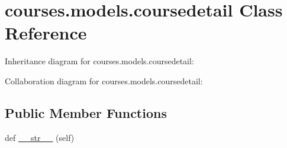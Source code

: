 \hypertarget{classcourses_1_1models_1_1coursedetail}{}\section{courses.\+models.\+coursedetail Class Reference}
\label{classcourses_1_1models_1_1coursedetail}


Inheritance diagram for courses.\+models.\+coursedetail\+:


Collaboration diagram for courses.\+models.\+coursedetail\+:
\subsection*{Public Member Functions}
\begin{DoxyCompactItemize}
\item 
def \hyperlink{classcourses_1_1models_1_1coursedetail_a93472a5aeac696203095dd262cda88af}{\+\_\+\+\_\+str\+\_\+\+\_\+} (self)
\end{DoxyCompactItemize}
